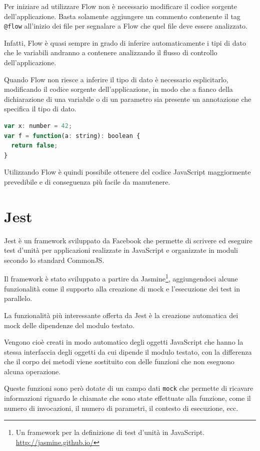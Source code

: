 Per iniziare ad utilizzare Flow non è necessario modificare il codice sorgente dell'applicazione. Basta solamente aggiungere un commento contenente il tag \texttt{@flow} all'inizio dei file per segnalare a Flow che quel file deve essere analizzato.

Infatti, Flow è quasi sempre in grado di inferire automaticamente i tipi di dato che le variabili andranno a contenere analizzando il flusso di controllo dell'applicazione.

Quando Flow non riesce a inferire il tipo di dato è necessario esplicitarlo, modificando il codice sorgente dell'applicazione, in modo che a fianco della dichiarazione di una variabile o di un parametro sia presente un annotazione che specifica il tipo di dato.

\begin{lstlisting}[language=JavaScript, caption=Esempio della notazione di Flow]
var x: number = 42;
var f = function(a: string): boolean {
  return false;
}
\end{lstlisting}

Utilizzando Flow è quindi possibile ottenere del codice JavaScript maggiormente prevedibile e di conseguenza più facile da manutenere.

\section{Jest}

Jest è un framework sviluppato da Facebook che permette di scrivere ed eseguire test d'unità per applicazioni realizzate in JavaScript e organizzate in moduli secondo lo standard CommonJS.

Il framework è stato sviluppato a partire da Jasmine\footnote{Un framework per la definizione di test d'unità in JavaScript. \url{http://jasmine.github.io/}}, aggiungendoci alcune funzionalità come il supporto alla creazione di \gls{mock} e l'esecuzione dei test in parallelo.

La funzionalità più interessante offerta da Jest è la creazione automatica dei mock delle dipendenze del modulo testato. 

Vengono cioè creati in modo automatico degli oggetti JavaScript che hanno la stessa interfaccia degli oggetti da cui dipende il modulo testato, con la differenza che il corpo dei metodi viene sostituito con delle funzioni che non eseguono alcuna operazione.

Queste funzioni sono però dotate di un campo dati \texttt{mock} che permette di ricavare informazioni riguardo le chiamate che sono state effettuate alla funzione, come il numero di invocazioni, il numero di parametri, il contesto di esecuzione, ecc.

